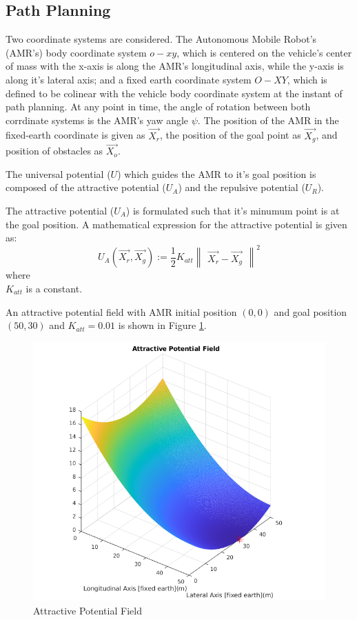 \documentclass[a4paper, twocolumn]{article}
\begin{document}
\subsection{Path Planning}
Two coordinate systems are considered. The Autonomous Mobile Robot's (AMR's) body coordinate system $\mathit{o-xy}$, 
which is centered on the vehicle's center of mass with the x-axis is along the AMR's longitudinal axis, 
while the y-axis is along it's lateral axis; and a fixed earth coordinate system $\mathit{O-XY}$, 
which is defined to be colinear with the vehicle body coordinate system at the instant of path planning. 
At any point in time, the angle of rotation between both corrdinate systems is the AMR's yaw angle $\psi$. 
The position of the AMR in the fixed-earth coordinate is given as $\vec{X_{r}}$, 
the position of the goal point as $\vec{X_{g}}$, and position of obstacles as $\vec{X_{o}}$.

The universal potential ($U$) which guides the AMR to it's goal position is composed of the attractive potential ($U_{A}$) 
and the repulsive potential ($U_{R}$).

The attractive potential ($U_{A}$) is formulated such that it's minumum point is at the goal position. 
A mathematical expression for the attractive potential is given as:
$$
U_{A}(\vec{X_{r}}, \vec{X_{g}}):= \frac{1}{2} K_{att} {\begin{Vmatrix}\vec{X_{r}} - \vec{X_{g}}\end{Vmatrix}}^{2}
$$
\noindent
where \\
$K_{att}$ is a constant.

\noindent
An attractive potential field with AMR initial position $(0, 0)$ and 
goal position $(50, 30)$ and $K_{att}= 0.01$ is shown in Figure \ref{fig:u_att}.

\begin{figure}
    \centering
    \includegraphics[scale=0.45]{presentation/img/u_att.png}
    \caption{Attractive Potential Field}
    \label{fig:u_att}
\end{figure}
\end{document}
